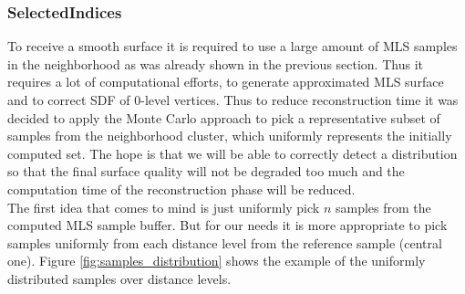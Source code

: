 \subsubsection{SelectedIndices}
To receive a smooth surface it is required to use a large amount of MLS samples in the neighborhood as was already shown in the previous section. Thus it requires a lot of computational efforts, to generate approximated MLS surface and to correct SDF of 0-level vertices. Thus to reduce reconstruction time it was decided to apply the Monte Carlo approach to pick a representative subset of samples from the neighborhood cluster, which uniformly represents the initially computed set. The hope is that we will be able to correctly detect a distribution so that the final surface quality will not be degraded too much and the computation time of the reconstruction phase will be reduced.\\
The first idea that comes to mind is just uniformly pick $n$ samples from the computed MLS sample buffer. But for our needs it is more appropriate to pick samples uniformly from each distance level from the reference sample (central one). Figure \ref{fig:samples_distribution} shows the example of the uniformly distributed samples over distance levels.
